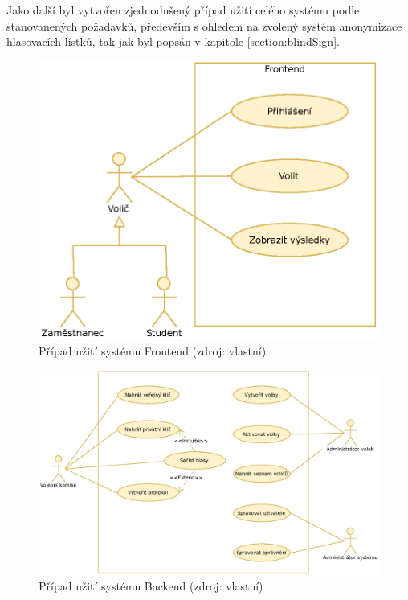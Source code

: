 Jako další byl vytvořen zjednodušený případ užití celého systému podle stanovanených požadavků, především s ohledem na zvolený systém anonymizace hlasovacích lístků, tak jak byl popsán v kapitole \ref{section:blindSign}.


\begin{figure}[h]
	\centering
	\includegraphics[width=0.5\linewidth]{svg/useCaseVolic.eps}
	\captionsetup{width=0.5\linewidth}
	\caption[Případ užití systému Frontend]{Případ užití systému Frontend (zdroj: vlastní)}
\end{figure}
\begin{figure}[h]
	\centering
	\includegraphics[width=\linewidth]{svg/useCaseBackend.eps}
	\captionsetup{width=\linewidth}
	\caption[Případ užití systému Backend]{Případ užití systému Backend (zdroj: vlastní)}
\end{figure}